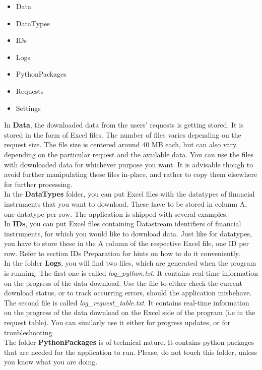 \begin{itemize}
	\item Data
	\item DataTypes
	\item IDs
	\item Logs
	\item PythonPackages
	\item Requests
	\item Settings
\end{itemize}

In \textbf{Data}, the downloaded data from the users' requests is getting stored. It is stored in the form of Excel files. The number of files varies depending on the request size. The file size is centered around 40 MB each, but can also vary, depending on the particular request and the available data. You can use the files with downloaded data for whichever purpose you want. It is advisable though to avoid further manipulating these files in-place, and rather to copy them elsewhere for further processing. \\

In the \textbf{DataTypes} folder, you can put Excel files with the datatypes of financial instruments that you want to download. These have to be stored in column A, one datatype per row. The application is shipped with several examples. \\

In \textbf{IDs}, you can put Excel files containing Datastream identifiers of financial instruments, for which you would like to download data. Just like for datatypes, you have to store these in the A column of the respective Excel file, one ID per row. Refer to section IDs Preparation for hints on how to do it conveniently. \\

In the folder \textbf{Logs}, you will find two files, which are generated when the program is running. The first one is called \textit{log\_python.txt}. It contains real-time information on the progress of the data download. Use the file to either check the current download status, or to track occurring errors, should the application misbehave. The second file is called \textit{log\_request\_table.txt}. It contains real-time information on the progress of the data download on the Excel side of the program (i.e in the request table). You can similarly use it either for progress updates, or for troubleshooting. \\

The folder \textbf{PythonPackages} is of technical nature. It contains python packages that are needed for the application to run. Please, do not touch this folder, unless you know what you are doing. \\

